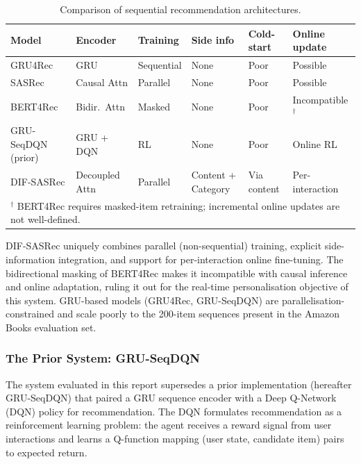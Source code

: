 \begin{table}[H]
\centering
\caption{Comparison of sequential recommendation architectures.}
\label{tab:seq_model_comparison}
\begin{tabular}{p{2.6cm} p{1.7cm} p{1.8cm} p{2.0cm} p{2.0cm} p{2.2cm}}
\hline
\textbf{Model} & \textbf{Encoder} & \textbf{Training} & \textbf{Side info} & \textbf{Cold-start} & \textbf{Online update} \\
\hline
GRU4Rec  & GRU            & Sequential & None    & Poor   & Possible \\
SASRec       & Causal Attn    & Parallel   & None    & Poor   & Possible \\
BERT4Rec    & Bidir.\ Attn   & Masked     & None    & Poor   & Incompatible$^\dagger$ \\
GRU-SeqDQN (prior)                  & GRU + DQN      & RL         & None    & Poor   & Online RL \\
DIF-SASRec & Decoupled Attn & Parallel   & Content + Category & Via content & Per-interaction \\
\hline
\multicolumn{6}{l}{\footnotesize $^\dagger$ BERT4Rec requires masked-item retraining; incremental online updates are not well-defined.} \\
\end{tabular}
\end{table}

DIF-SASRec uniquely combines parallel (non-sequential) training, explicit side-information integration, and support for per-interaction online fine-tuning.
The bidirectional masking of BERT4Rec makes it incompatible with causal inference and online adaptation, ruling it out for the real-time personalisation objective of this system.
GRU-based models (GRU4Rec, GRU-SeqDQN) are parallelisation-constrained and scale poorly to the 200-item sequences present in the Amazon Books evaluation set.

\subsubsection{The Prior System: GRU-SeqDQN}

The system evaluated in this report supersedes a prior implementation (hereafter GRU-SeqDQN) that paired a GRU sequence encoder with a Deep Q-Network (DQN) policy for recommendation.
The DQN formulates recommendation as a reinforcement learning problem: the agent receives a reward signal from user interactions and learns a Q-function mapping (user state, candidate item) pairs to expected return.

